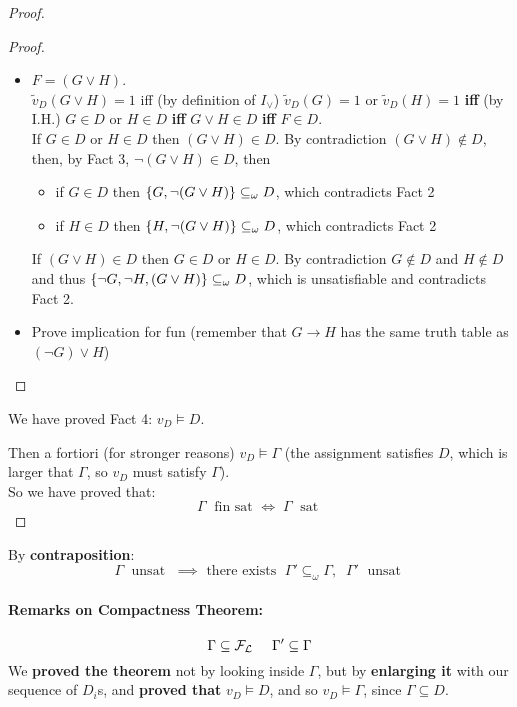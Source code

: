 \begin{proof}
\begin{proof}
\begin{itemize}
				\item $F = (G \vee H)$.\\
				$\tilde{v}_D (G \vee H) = 1$ iff (by definition of $I_\vee$) $\tilde{v}_D (G) = 1$ or $\tilde{v}_D (H) = 1$ \textbf{iff} (by I.H.) $G \in D$ or $H \in D$ \textbf{iff} $G \vee H \in D$ \textbf{iff} $F \in D$.\\
				If $G \in D$ or $H \in D$ then $(G \vee H) \in D$. By contradiction $(G \vee H) \notin D$, then, by Fact 3, $\neg (G \vee H) \in D$, then
				\begin{itemize}
					\item if $G \in D$ then $\{G, \neg (G \vee H)\} \subseteq_\omega D$, which contradicts Fact 2
					\item if $H \in D$ then $\{H, \neg (G \vee H)\} \subseteq_\omega D$, which contradicts Fact 2
				\end{itemize}
				If $(G \vee H) \in D$ then $G \in D$ or $H \in D$. By contradiction $G \notin D$ and $H \notin D$ and thus $\{\neg G, \neg H, (G \vee H)\} \subseteq_\omega D$, which is unsatisfiable and contradicts Fact 2.\\

				\item Prove implication for fun (remember that $G \rightarrow H$ has the same truth table as $(\neg G) \vee H$)
			\end{itemize}
		\end{proof}
		We have proved Fact 4: $v_D \models D$.\\

		\newpage

		Then a fortiori (for stronger reasons) $v_D \models \Gamma$ (the assignment satisfies $D$, which is larger that $\Gamma$, so $v_D$ must satisfy $\Gamma$).\\

		So we have proved that:
		$$ \Gamma \; \text{ fin sat } \Leftrightarrow \; \Gamma \; \text{ sat } $$
	\end{proof}

	By \textbf{contraposition}:
	$$ \Gamma \; \text{ unsat } \; \implies \text{ there exists } \; \Gamma ' \subseteq_\omega \Gamma, \;\; \Gamma' \; \text{ unsat } $$

	\paragraph{Remarks on Compactness Theorem:}
	$$ \Gamma \subseteq \mathcal{F}_\mathcal{L}  \;\;\;\;\; \Gamma' \subseteq \Gamma $$
	We \textbf{proved the theorem} not by looking inside $\Gamma$, but by \textbf{enlarging it} with our sequence of $D_i$s, and \textbf{proved that} $v_D \models D$, and so $v_D \models \Gamma$, since $\Gamma \subseteq D$.\\

